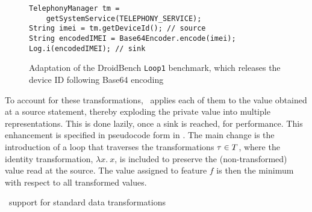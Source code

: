 \begin{figure}
\begin{lstlisting}
TelephonyManager tm =
    getSystemService(TELEPHONY_SERVICE);
String imei = tm.getDeviceId(); // source
String encodedIMEI = Base64Encoder.encode(imei);
Log.i(encodedIMEI); // sink
\end{lstlisting}
\caption{\label{Fi:encodedFlow} Adaptation of the DroidBench {\tt Loop1} benchmark, which releases the device ID following Base64 encoding}
\end{figure}

To account for these transformations, \Tool\  applies each of them to the value obtained at a source statement, thereby exploding the private value into multiple representations. This is done lazily, once a sink is reached, for performance. This enhancement is specified in pseudocode form in . The main change is the introduction of a loop that traverses the transformations $\tau \in T$, where the identity transformation, $\lambda x.\ x$, is included to preserve the (non-transformed) value read at the source. The value assigned to feature $f$ is then the minimum with respect to all transformed values.

\begin{algorithm}[t]
\begin{small}
\DontPrintSemicolon
{}
\;
\end{small}
\caption{\label{Al:transform}\Tool\ support for standard data transformations}
\end{algorithm}

